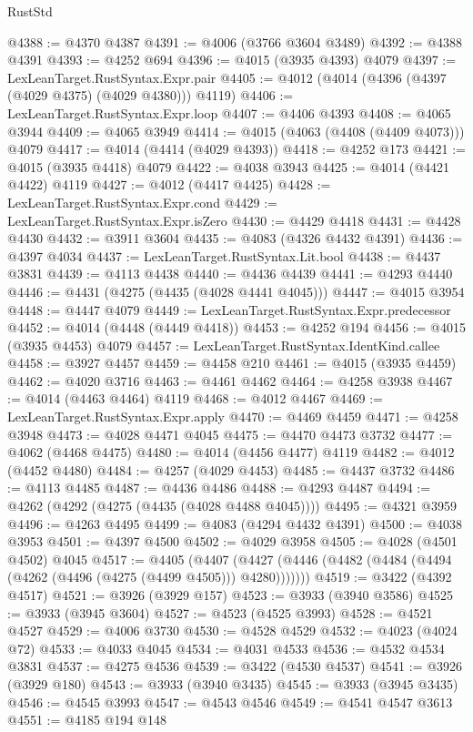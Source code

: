 \begin{lexlean}{RustStd}
\begin{coremodule}
@4388 := @4370 @4387
@4391 := @4006 (@3766 @3604 @3489)
@4392 := @4388 @4391
@4393 := @4252 @694
@4396 := @4015 (@3935 @4393) @4079
@4397 := LexLeanTarget.RustSyntax.Expr.pair
@4405 := @4012 (@4014 (@4396 (@4397 (@4029 @4375) (@4029 @4380))) @4119)
@4406 := LexLeanTarget.RustSyntax.Expr.loop
@4407 := @4406 @4393
@4408 := @4065 @3944
@4409 := @4065 @3949
@4414 := @4015 (@4063 (@4408 (@4409 @4073))) @4079
@4417 := @4014 (@4414 (@4029 @4393))
@4418 := @4252 @173
@4421 := @4015 (@3935 @4418) @4079
@4422 := @4038 @3943
@4425 := @4014 (@4421 @4422) @4119
@4427 := @4012 (@4417 @4425)
@4428 := LexLeanTarget.RustSyntax.Expr.cond
@4429 := LexLeanTarget.RustSyntax.Expr.isZero
@4430 := @4429 @4418
@4431 := @4428 @4430
@4432 := @3911 @3604
@4435 := @4083 (@4326 @4432 @4391)
@4436 := @4397 @4034
@4437 := LexLeanTarget.RustSyntax.Lit.bool
@4438 := @4437 @3831
@4439 := @4113 @4438
@4440 := @4436 @4439
@4441 := @4293 @4440
@4446 := @4431 (@4275 (@4435 (@4028 @4441 @4045)))
@4447 := @4015 @3954
@4448 := @4447 @4079
@4449 := LexLeanTarget.RustSyntax.Expr.predecessor
@4452 := @4014 (@4448 (@4449 @4418))
@4453 := @4252 @194
@4456 := @4015 (@3935 @4453) @4079
@4457 := LexLeanTarget.RustSyntax.IdentKind.callee
@4458 := @3927 @4457
@4459 := @4458 @210
@4461 := @4015 (@3935 @4459)
@4462 := @4020 @3716
@4463 := @4461 @4462
@4464 := @4258 @3938
@4467 := @4014 (@4463 @4464) @4119
@4468 := @4012 @4467
@4469 := LexLeanTarget.RustSyntax.Expr.apply
@4470 := @4469 @4459
@4471 := @4258 @3948
@4473 := @4028 @4471 @4045
@4475 := @4470 @4473 @3732
@4477 := @4062 (@4468 @4475)
@4480 := @4014 (@4456 @4477) @4119
@4482 := @4012 (@4452 @4480)
@4484 := @4257 (@4029 @4453)
@4485 := @4437 @3732
@4486 := @4113 @4485
@4487 := @4436 @4486
@4488 := @4293 @4487
@4494 := @4262 (@4292 (@4275 (@4435 (@4028 @4488 @4045))))
@4495 := @4321 @3959
@4496 := @4263 @4495
@4499 := @4083 (@4294 @4432 @4391)
@4500 := @4038 @3953
@4501 := @4397 @4500
@4502 := @4029 @3958
@4505 := @4028 (@4501 @4502) @4045
@4517 := @4405
    (@4407 (@4427 (@4446 (@4482 (@4484 (@4494 (@4262 (@4496 (@4275 (@4499 @4505))) @4280)))))))
@4519 := @3422 (@4392 @4517)
@4521 := @3926 (@3929 @157)
@4523 := @3933 (@3940 @3586)
@4525 := @3933 (@3945 @3604)
@4527 := @4523 (@4525 @3993)
@4528 := @4521 @4527
@4529 := @4006 @3730
@4530 := @4528 @4529
@4532 := @4023 (@4024 @72)
@4533 := @4033 @4045
@4534 := @4031 @4533
@4536 := @4532 @4534 @3831
@4537 := @4275 @4536
@4539 := @3422 (@4530 @4537)
@4541 := @3926 (@3929 @180)
@4543 := @3933 (@3940 @3435)
@4545 := @3933 (@3945 @3435)
@4546 := @4545 @3993
@4547 := @4543 @4546
@4549 := @4541 @4547 @3613
@4551 := @4185 @194 @148

\end{coremodule}
\end{lexlean}
